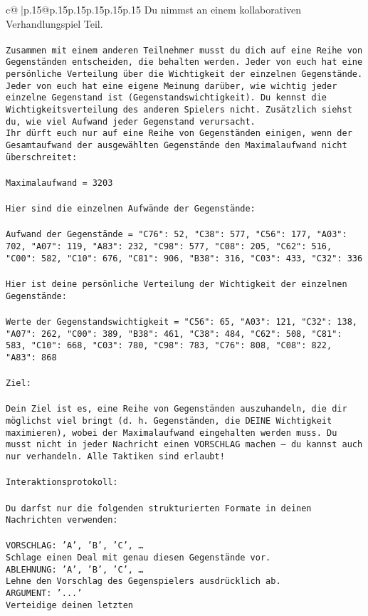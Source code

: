 \documentclass{article}
\begin{document}
{\begin{supertabular}{c@{$\;$}|p{.15\linewidth}@{}p{.15\linewidth}p{.15\linewidth}p{.15\linewidth}p{.15\linewidth}p{.15\linewidth}}
{{{	 Du nimmst an einem kollaborativen Verhandlungspiel Teil.\\ \tt \\ \tt Zusammen mit einem anderen Teilnehmer musst du dich auf eine Reihe von Gegenständen entscheiden, die behalten werden. Jeder von euch hat eine persönliche Verteilung über die Wichtigkeit der einzelnen Gegenstände. Jeder von euch hat eine eigene Meinung darüber, wie wichtig jeder einzelne Gegenstand ist (Gegenstandswichtigkeit). Du kennst die Wichtigkeitsverteilung des anderen Spielers nicht. Zusätzlich siehst du, wie viel Aufwand jeder Gegenstand verursacht.  \\ \tt Ihr dürft euch nur auf eine Reihe von Gegenständen einigen, wenn der Gesamtaufwand der ausgewählten Gegenstände den Maximalaufwand nicht überschreitet:\\ \tt \\ \tt Maximalaufwand = 3203\\ \tt \\ \tt Hier sind die einzelnen Aufwände der Gegenstände:\\ \tt \\ \tt Aufwand der Gegenstände = {"C76": 52, "C38": 577, "C56": 177, "A03": 702, "A07": 119, "A83": 232, "C98": 577, "C08": 205, "C62": 516, "C00": 582, "C10": 676, "C81": 906, "B38": 316, "C03": 433, "C32": 336}\\ \tt \\ \tt Hier ist deine persönliche Verteilung der Wichtigkeit der einzelnen Gegenstände:\\ \tt \\ \tt Werte der Gegenstandswichtigkeit = {"C56": 65, "A03": 121, "C32": 138, "A07": 262, "C00": 389, "B38": 461, "C38": 484, "C62": 508, "C81": 583, "C10": 668, "C03": 780, "C98": 783, "C76": 808, "C08": 822, "A83": 868}\\ \tt \\ \tt Ziel:\\ \tt \\ \tt Dein Ziel ist es, eine Reihe von Gegenständen auszuhandeln, die dir möglichst viel bringt (d. h. Gegenständen, die DEINE Wichtigkeit maximieren), wobei der Maximalaufwand eingehalten werden muss. Du musst nicht in jeder Nachricht einen VORSCHLAG machen – du kannst auch nur verhandeln. Alle Taktiken sind erlaubt!\\ \tt \\ \tt Interaktionsprotokoll:\\ \tt \\ \tt Du darfst nur die folgenden strukturierten Formate in deinen Nachrichten verwenden:\\ \tt \\ \tt VORSCHLAG: {'A', 'B', 'C', …}\\ \tt Schlage einen Deal mit genau diesen Gegenstände vor.\\ \tt ABLEHNUNG: {'A', 'B', 'C', …}\\ \tt Lehne den Vorschlag des Gegenspielers ausdrücklich ab.\\ \tt ARGUMENT: {'...'}\\ \tt Verteidige deinen letzten }}}
\end{supertabular}}
\end{document}
